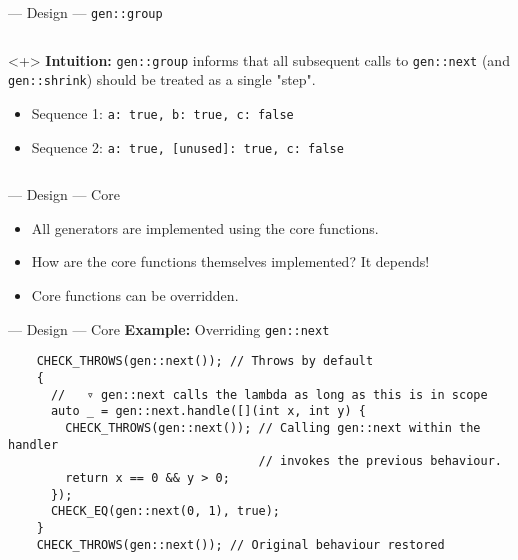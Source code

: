 \begin{frame}[fragile,t]{\halcheck{} --- Design --- \texttt{gen::group}}
\begin{columns}[T]
    \begin{onlyenv}<+>
      \textbf{Intuition:} \texttt{gen::group} informs \halcheck{} that all subsequent calls to \texttt{gen::next} (and \texttt{gen::shrink}) should be treated as a single "step".

      \begin{itemize}
        \item Sequence 1: \texttt{{{a: true, b: true}, c: false}}
        \item Sequence 2: \texttt{{{a: true, [unused]: true}, c: false}}
      \end{itemize}
    \end{onlyenv}
  \end{columns}
\end{frame}

\begin{frame}[fragile]{\halcheck{} --- Design --- Core}
  \begin{itemize}
    \item All generators are implemented using the core functions.
          \pause{}
    \item How are the core functions themselves implemented?
          \pause\alert{It depends!}
    \item Core functions can be \alert{overridden}.
  \end{itemize}
\end{frame}

\begin{frame}[fragile]{\halcheck{} --- Design --- Core}
  \textbf{Example:} Overriding \texttt{gen::next}
  \begin{verbatim}
    CHECK_THROWS(gen::next()); // Throws by default
    {
      //   ▿ gen::next calls the lambda as long as this is in scope
      auto _ = gen::next.handle([](int x, int y) {
        CHECK_THROWS(gen::next()); // Calling gen::next within the handler
                                   // invokes the previous behaviour.
        return x == 0 && y > 0;
      });
      CHECK_EQ(gen::next(0, 1), true);
    }
    CHECK_THROWS(gen::next()); // Original behaviour restored
  \end{verbatim}
\end{frame}

